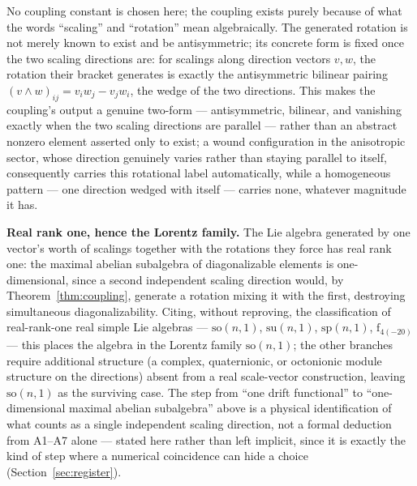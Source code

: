 \documentclass[aps,prd,twocolumn,superscriptaddress,nofootinbib]{revtex4-2}
\begin{document}
No coupling constant is chosen here; the coupling exists purely because
of what the words ``scaling'' and ``rotation'' mean algebraically. The
generated rotation is not merely known to exist and be antisymmetric;
its concrete form is fixed once the two scaling directions are: for
scalings along direction vectors $v,w$, the rotation their bracket
generates is exactly the antisymmetric bilinear pairing
$(v\wedge w)_{ij} = v_iw_j-v_jw_i$, the wedge of the two directions.
This makes the coupling's output a genuine two-form — antisymmetric,
bilinear, and vanishing exactly when the two scaling directions are
parallel — rather than an abstract nonzero element asserted only to
exist; a wound configuration in the anisotropic sector, whose direction
genuinely varies rather than staying parallel to itself, consequently
carries this rotational label automatically, while a homogeneous
pattern — one direction wedged with itself — carries none, whatever
magnitude it has.

\textbf{Real rank one, hence the Lorentz family.} The Lie algebra
generated by one vector's worth of scalings together with the rotations
they force has real rank one: the maximal abelian subalgebra of
diagonalizable elements is one-dimensional, since a second independent
scaling direction would, by Theorem~\ref{thm:coupling}, generate a
rotation mixing it with the first, destroying simultaneous
diagonalizability. Citing, without reproving, the classification of
real-rank-one real simple Lie algebras — $\mathrm{so}(n,1)$,
$\mathrm{su}(n,1)$, $\mathrm{sp}(n,1)$, $\mathrm{f}_{4(-20)}$ — this
places the algebra in the Lorentz family $\mathrm{so}(n,1)$; the other
branches require additional structure (a complex, quaternionic, or
octonionic module structure on the directions) absent from a real
scale-vector construction, leaving $\mathrm{so}(n,1)$ as the surviving
case. The step from ``one drift functional'' to ``one-dimensional
maximal abelian subalgebra'' above is a physical identification of what
counts as a single independent scaling direction, not a formal
deduction from A1–A7 alone — stated here rather than left implicit, since
it is exactly the kind of step where a numerical coincidence can hide a
choice (Section~\ref{sec:register}).
\end{document}
